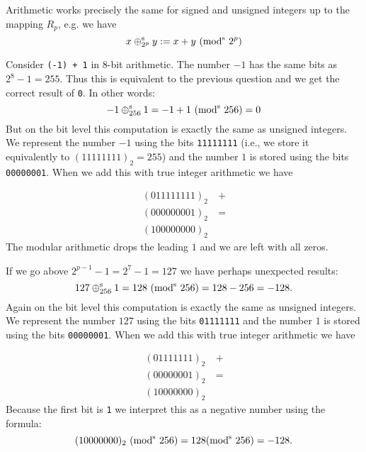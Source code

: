 Arithmetic works precisely the same for signed and unsigned integers up to the mapping $R_p$, e.g. we have
\[
x \ensuremath{\oplus}_{2^p}^{\rm s} y := x + y\ ({\rm mod}^{\rm s}\ 2^p)
\]
\begin{example} Consider \texttt{(-1) + 1} in 8-bit arithmetic. The number $-1$ has the same bits as $2^8 - 1 = 255$. Thus this is equivalent to the previous question and we get the correct result of \texttt{0}. In other words:
\[
-1 \ensuremath{\oplus}_{256}^{\rm s} 1 = -1 + 1 \ ({\rm mod}^{\rm s}\ 256) = 0
\]
But on the bit level this computation is exactly the same as unsigned integers. We represent the number $-1$ using the bits \texttt{11111111} (i.e., we store it equivalently to  $(11111111)_2 = 255$) and the  number $1$ is stored using the bits \texttt{00000001}. When we add this with true integer arithmetic we have


\begin{align*}
(0 11111111)_2 &\ + \\
(0 00000001)_2 &\ = \\
(1 00000000)_2&
\end{align*}
The modular arithmetic drops the leading $1$ and we are left with all zeros.

\end{example}

\begin{example} If we go above $2^{p-1}-1 = 2^7 - 1 = 127$  we have perhaps unexpected results:
\[
127 \ensuremath{\oplus}_{256}^{\rm s} 1 = 128\  ({\rm mod}^{\rm s}\ 256) = 128 - 256 = -128.
\]
Again on the bit level this computation is exactly the same as unsigned integers. We represent the number $127$ using the bits \texttt{01111111} and the  number $1$ is stored using the bits \texttt{00000001}. When we add this with true integer arithmetic we have


\begin{align*}
(01111111)_2 &\ + \\
(00000001)_2 &\ = \\
(10000000)_2&
\end{align*}
Because the first bit is \texttt{1} we interpret this as a negative number using the formula:
\[
(10000000)_2\ ({\rm mod}^{\rm s}\ 256) = 128   ({\rm mod}^{\rm s}\ 256) = -128.
\]
\end{example}

